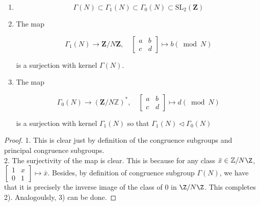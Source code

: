 \begin{proposition}
\leavevmode\vspace{-\baselineskip}
\begin{enumerate}


    \item $$
\Gamma(N) \subset \Gamma_{1}(N) \subset \Gamma_{0}(N) \subset \mathrm{SL}_{2}(\mathbf{Z})
$$
\item  The map

$$
\Gamma_{1}(N) \longrightarrow \mathbf{Z} / N \mathbf{Z}, \quad\left[\begin{array}{ll}
a & b \\
c & d
\end{array}\right] \mapsto b(\bmod N)
$$

is a surjection with kernel $\Gamma(N)$.
\item The map

$$
\Gamma_{0}(N) \longrightarrow(\mathbf{Z} / N \mathbb{Z})^{*}, \quad\left[\begin{array}{ll}
a & b \\
c & d
\end{array}\right] \mapsto d(\bmod N)
$$

is a surjection with kernel $\Gamma_{1}(N)$ so that $\Gamma_{1}(N) \triangleleft \Gamma_{0}(N)$
\end{enumerate}   
\end{proposition}

\begin{proof}
    1. This is clear just by definition of the congruence subgroups and principal congruence subgroups. \\
    2. The surjectivity of the map is clear. This is because for any class $\bar{x}\in \mathbb{Z}/N\Z$, $\left[\begin{array}{ll}
1 & x \\
0 & 1
\end{array}\right] \mapsto \bar{x}$. Besides, by definition of congruence subgroup $\Gamma(N)$, we have that it is precisely the inverse image of the class of 0 in $\Z/N\Z$. This completes 2). Analogoulsly, 3) can be done.
\end{proof}
    
